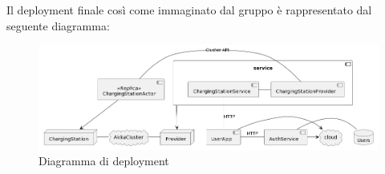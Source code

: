 Il deployment finale così come immaginato dal gruppo è rappresentato dal seguente diagramma:

\begin{figure}[H]
    \centering
    \includegraphics[width=1\textwidth]{images/deployment.png}
    \caption{Diagramma di deployment}
\end{figure}







\newpage
